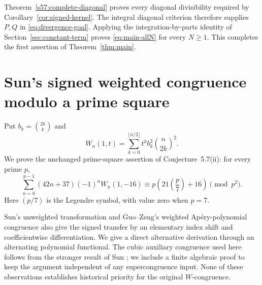 \documentclass[11pt,a4paper]{article}
\numberwithin{equation}{section}
\theoremstyle{remark}
\begin{document}
Theorem~\ref{s57:complete-diagonal} proves every diagonal
divisibility required by Corollary~\ref{cor:signed-kernel}.
The integral diagonal criterion therefore supplies \(P,Q\)
in \eqref{eq:divergence-goal}. Applying the integration-by-parts
identity of Section~\ref{sec:constant-term} proves
\eqref{eq:main-allN} for every \(N\ge1\).
This completes the first assertion of Theorem~\ref{thm:main}.


\section{Sun's signed weighted congruence modulo a prime square}

Put $b_k=\binom{2k}k$ and
\[
 W_n(1,t)=\sum_{k=0}^{\lfloor n/2\rfloor}
 t^k b_k^2\binom n{2k}^{\!2}.
\]
We prove the unchanged prime-square assertion of
Conjecture~5.7(ii): for every prime $p$,
\begin{equation}\label{eq:sun57-target}
 \sum_{n=0}^{p-1}(42n+37)(-1)^nW_n(1,-16)
 \equiv p\left(21\left(\frac p7\right)+16\right)\pmod{p^2}.
\end{equation}
Here $(p/7)$ is the Legendre symbol, with value zero when $p=7$.

Sun's unweighted transformation and Guo--Zeng's weighted
Ap\'ery-polynomial congruence \cite{SunApery2012,GuoZeng2012}
also give the signed transfer by an elementary index shift and
coefficientwise differentiation. We give a direct alternative
derivation through an alternating polynomial functional. The cubic
auxiliary congruence used here follows from the stronger result
of Sun \cite[Theorem 1.3, (1.15)]{SunEuler2011};
we include a finite algebraic proof to keep the argument independent
of any supercongruence input. None of these observations establishes
historical priority for the original $W$-congruence.
\end{document}
